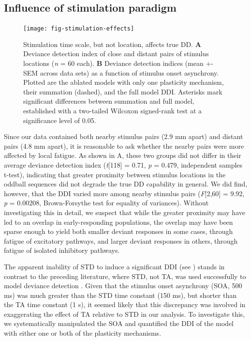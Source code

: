 \documentclass[9pt,lineno,onehalfspacing]{elife}
\begin{document}
\subsection{Influence of stimulation paradigm}

\begin{figure}
    \texttt{[image: fig-stimulation-effects]}
    \caption{%
        Stimulation time scale, but not location, affects true DD.
        \textbf{A} Deviance detection index of close and distant pairs of stimulus locations (\textit{n} = 60 each).
        \textbf{B} Deviance detection indices (mean +- SEM across data sets) as a function of stimulus onset asynchrony. Plotted are the ablated models with only one plasticity mechanism, their summation (dashed), and the full model DDI. Asterisks mark significant differences between summation and full model, established with a two-tailed Wilcoxon signed-rank test at a significance level of 0.05.
    }
    \label{fig:stimulation-effects}
\end{figure}

Since our data contained both nearby stimulus pairs (2.9 mm apart) and distant pairs (4.8 mm apart), it is reasonable to ask whether the nearby pairs were more affected by local fatigue. As shown in A, these two groups did not differ in their average deviance detection index (\textit{t}[118] = 0.71, \textit{p} = 0.479, independent samples t-test), indicating that greater proximity between stimulus locations in the oddball sequences did not degrade the true DD capability in general. We did find, however, that the DDI varied more among nearby stimulus pairs (\textit{F}[2,60] = 9.92, \textit{p} = 0.00208, Brown-Forsythe test for equality of variances). Without investigating this in detail, we suspect that while the greater proximity may have led to an overlap in early-responding populations, the overlap may have been sparse enough to yield both smaller deviant responses in some cases, through fatigue of excitatory pathways, and larger deviant responses in others, through fatigue of isolated inhibitory pathways.

The apparent inability of STD to induce a significant DDI (see ) stands in contrast to the preceding literature, where STD, not TA, was used successfully to model deviance detection \citep{Mill2011-ah, May2015-lt, Yarden2017-eh}. Given that the stimulus onset asynchrony (SOA, 500 ms) was much greater than the STD time constant (150 ms), but shorter than the TA time constant (1 s), it seemed likely that this discrepancy was involved in exaggerating the effect of TA relative to STD in our analysis. To investigate this, we systematically manipulated the SOA and quantified the DDI of the model with either one or both of the plasticity mechanisms.
\end{document}
